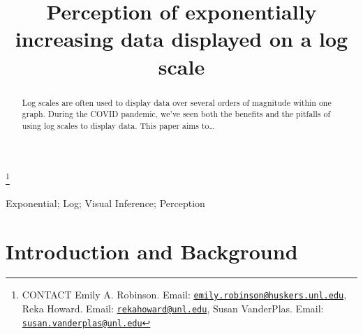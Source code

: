 \documentclass[]{interact}
\theoremstyle{plain}%
\theoremstyle{definition}
\theoremstyle{remark}
\begin{document}

\title{Perception of exponentially increasing data displayed on a log scale}


\author{
}

\thanks{CONTACT Emily A. Robinson. Email: \href{mailto:emily.robinson@huskers.unl.edu}{\nolinkurl{emily.robinson@huskers.unl.edu}}, Reka Howard. Email: \href{mailto:rekahoward@unl.edu}{\nolinkurl{rekahoward@unl.edu}}, Susan VanderPlas. Email: \href{mailto:susan.vanderplas@unl.edu}{\nolinkurl{susan.vanderplas@unl.edu}}}

\maketitle

\begin{abstract}
Log scales are often used to display data over several orders of
magnitude within one graph. During the COVID pandemic, we've seen both
the benefits and the pitfalls of using log scales to display data. This
paper aims to\ldots{}
\end{abstract}

\begin{keywords}
Exponential; Log; Visual Inference; Perception
\end{keywords}

\hypertarget{introduction-and-background}{%
\section{Introduction and
Background}\label{introduction-and-background}}
\end{document}
